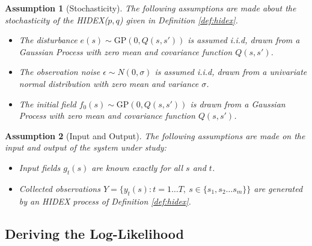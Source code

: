 \documentclass{IEEEtran}
\newtheorem{assumption}{Assumption}
\begin{document}
\begin{assumption}[Stochasticity]
	\label{ass:noise}
	The following assumptions are made about the stochasticity of the HIDEX($p,q$) given in Definition \ref{def:hidex}.
	\begin{itemize}
		\item The disturbance $e(s) \sim \mathrm{GP}(0,Q(s,s'))$ is assumed i.i.d, drawn from a Gaussian Process with zero mean and covariance function $Q(s,s')$.
		\item The observation noise $\epsilon \sim N(0,\sigma)$ is assumed i.i.d, drawn from a univariate normal distribution with zero mean and variance $\sigma$.
		\item The initial field $f_0(s) \sim \mathrm{GP}(0,Q(s,s'))$ is drawn from a Gaussian Process with zero mean and covariance function $Q(s,s')$.
	\end{itemize}
\end{assumption}

\begin{assumption}[Input and Output]
	\label{ass:inout}
The following assumptions are made on the input and output of the system under study:
	\begin{itemize}
		\item Input fields $g_t(s)$ are known exactly for all $s$ and $t$.
		\item Collected observations $Y = \{ y_t(s) : t = 1 \ldots T, ~ s \in \{s_1, s_2 \ldots s_m\} \}$ are generated by an HIDEX process of Definition \ref{def:hidex}.
	\end{itemize}
\end{assumption}

\subsection{Deriving the Log-Likelihood}
\end{document}
